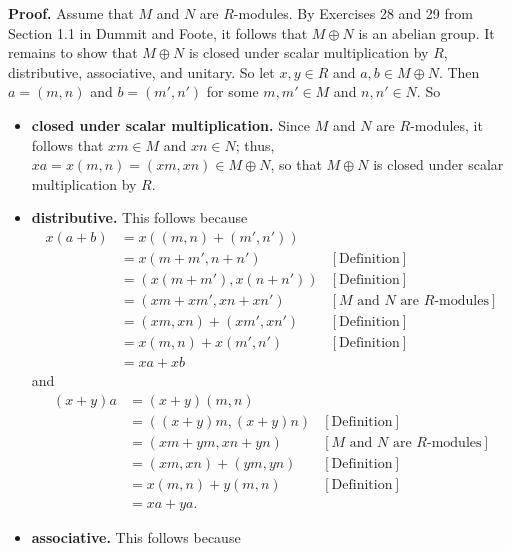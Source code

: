 \documentclass[9pt]{article}
\begin{document}
\begin{enumerate}
      \textbf{Proof.} Assume that $M$ and $N$ are $R$-modules. By Exercises 28
      and 29 from Section 1.1 in Dummit and Foote, it follows that $M \oplus N$
      is an abelian group. It remains to show that $M \oplus N$ is closed under
      scalar multiplication by $R$, distributive, associative, and unitary. So
      let $x, y \in R$ and $a, b \in M \oplus N$. Then $a = (m, n)$ and
      $b = (m', n')$ for some $m, m' \in M$ and $n, n' \in N$. So 
      \begin{itemize}
         \item \textbf{closed under scalar multiplication.} Since $M$ and $N$
               are $R$-modules, it follows that $xm \in M$ and $xn \in N$; thus,
               $xa = x(m, n) = (xm, xn) \in M \oplus N$, so that $M \oplus N$
               is closed under scalar multiplication by $R$.
         \item \textbf{distributive.} This follows because
               \begin{align*}
                  x(a + b) &= x((m, n) + (m', n')) \\
                     &= x(m + m', n + n') &[\text{Definition}] \\
                     &= (x(m + m'), x(n + n')) &[\text{Definition}] \\
                     &= (xm + xm', xn + xn')
                        &[M\text{ and }N \text{ are } R\text{-modules}] \\
                     &= (xm, xn) + (xm', xn') &[\text{Definition}] \\
                     &= x(m, n) + x(m', n') &[\text{Definition}] \\
                     &= xa + xb
               \end{align*}
               and
               \begin{align*}
                  (x + y)a &= (x + y)(m, n) \\
                     &= ((x + y)m, (x + y)n) &[\text{Definition}] \\
                     &= (xm + ym, xn + yn)
                        &[M\text{ and }N \text{ are } R\text{-modules}] \\
                     &= (xm, xn) + (ym, yn) &[\text{Definition}] \\
                     &= x(m, n) + y(m, n) &[\text{Definition}] \\
                     &= xa + ya.
               \end{align*}
         \item \textbf{associative.} This follows because

\end{itemize}
\end{enumerate}
\end{document}
